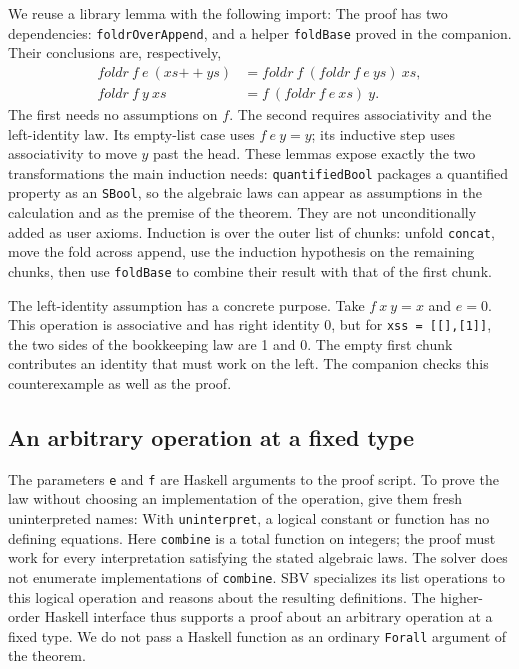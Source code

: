 \documentclass[acmsmall,screen,review,anonymous,nonacm]{acmart}
\newcommand{\code}[1]{\texttt{#1}}
\begin{document}
We reuse a library lemma with the following import:
The proof has two dependencies: \code{foldrOverAppend}, and a helper
\code{foldBase} proved in the companion. Their conclusions are, respectively,
\[
\begin{aligned}
 \mathit{foldr}\ f\ e\ (xs \mathbin{++} ys)
   &= \mathit{foldr}\ f\ (\mathit{foldr}\ f\ e\ ys)\ xs,\\
 \mathit{foldr}\ f\ y\ xs &= f\ (\mathit{foldr}\ f\ e\ xs)\ y.
\end{aligned}
\]
The first needs no assumptions on $f$. The second requires associativity and
the left-identity law. Its empty-list case uses
$f\ e\ y=y$; its inductive step uses associativity to move $y$ past the head.
These lemmas expose exactly the two transformations the main induction needs:
\code{quantifiedBool} packages a quantified property as an \code{SBool}, so the
algebraic laws can appear as assumptions in the calculation and as the premise
of the theorem. They are not unconditionally added as user axioms. Induction
is over the outer list of chunks: unfold \code{concat}, move the fold across
append, use the induction hypothesis on the remaining chunks, then use
\code{foldBase} to combine their result with that of the first chunk.

The left-identity assumption has a concrete purpose. Take $f\ x\ y=x$ and
$e=0$. This operation is associative and has right identity 0, but for
\code{xss = [[],[1]]}, the two sides of the bookkeeping law are 1 and 0.
The empty first chunk contributes an identity that must work on the left.
The companion checks this counterexample as well as the proof.

\subsection{An arbitrary operation at a fixed type}

The parameters \code{e} and \code{f} are Haskell arguments to the proof script.
To prove the law without choosing an implementation of the operation, give
them fresh uninterpreted names:
With \code{uninterpret}, a logical constant or function has no defining equations.
Here \code{combine} is a total function on integers; the proof must
work for every interpretation satisfying the stated algebraic laws. The solver
does not enumerate implementations of \code{combine}. SBV specializes its list
operations to this logical operation and reasons about the resulting
definitions. The higher-order Haskell interface thus supports a proof about an
arbitrary operation at a fixed type. We do not pass a Haskell function as an
ordinary \code{Forall} argument of the theorem.
\end{document}
